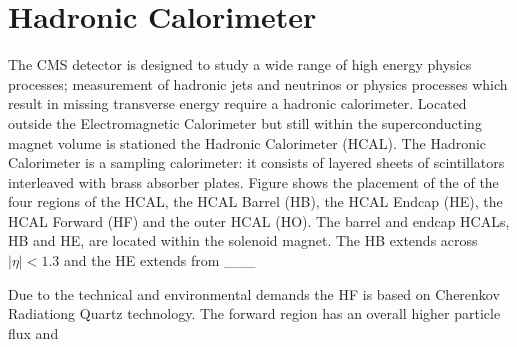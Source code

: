 \section{Hadronic Calorimeter}
The CMS detector is designed to study a wide range of high energy 
physics processes; measurement of hadronic jets and neutrinos or
physics processes which result in missing transverse energy require
a hadronic calorimeter. 
Located outside the Electromagnetic Calorimeter but still within the
superconducting magnet volume is stationed the Hadronic Calorimeter (HCAL).
The Hadronic Calorimeter is a sampling calorimeter: it consists of layered 
sheets of scintillators interleaved with brass absorber plates. Figure %
shows the placement of the of the four regions of the HCAL, the HCAL Barrel (HB),
the HCAL Endcap (HE), the HCAL Forward (HF) and the outer HCAL (HO). 
The barrel and endcap HCALs, HB and HE, are located within the 
solenoid magnet. The HB extends across $|\eta|<1.3$ and the HE extends from ___


Due to the technical and environmental demands the HF is based on
Cherenkov Radiationg Quartz technology. The forward region has an overall 
higher particle flux and 


